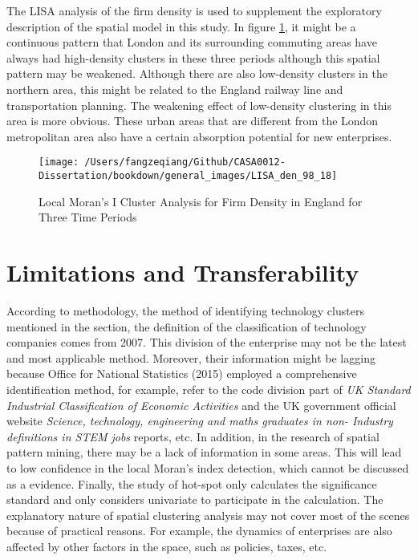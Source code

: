 \documentclass[
  12pt,
  oneside]{book}
\begin{document}
The LISA analysis of the firm density is used to supplement the exploratory description of the spatial model in this study. In figure \ref{fig:fig-lisa-den}, it might be a continuous pattern that London and its surrounding commuting areas have always had high-density clusters in these three periods although this spatial pattern may be weakened. Although there are also low-density clusters in the northern area, this might be related to the England railway line and transportation planning. The weakening effect of low-density clustering in this area is more obvious. These urban areas that are different from the London metropolitan area also have a certain absorption potential for new enterprises.

\begin{figure}
\texttt{[image: /Users/fangzeqiang/Github/CASA0012-Dissertation/bookdown/general\_images/LISA\_den\_98\_18]} \caption{Local Moran's I Cluster Analysis for Firm Density in England for Three Time Periods}\label{fig:fig-lisa-den}
\end{figure}

\hypertarget{limitations-and-transferability}{%
\section{Limitations and Transferability}\label{limitations-and-transferability}}

According to methodology, the method of identifying technology clusters mentioned in the section, the definition of the classification of technology companies comes from 2007. This division of the enterprise may not be the latest and most applicable method. Moreover, their information might be lagging because Office for National Statistics (2015) employed a comprehensive identification method, for example, refer to the code division part of \emph{UK Standard Industrial Classification of Economic Activities} and the UK government official website \emph{Science, technology, engineering and maths graduates in non- Industry definitions in STEM jobs} reports, etc. In addition, in the research of spatial pattern mining, there may be a lack of information in some areas. This will lead to low confidence in the local Moran's index detection, which cannot be discussed as a evidence. Finally, the study of hot-spot only calculates the significance standard and only considers univariate to participate in the calculation. The explanatory nature of spatial clustering analysis may not cover most of the scenes because of practical reasons. For example, the dynamics of enterprises are also affected by other factors in the space, such as policies, taxes, etc.
\end{document}
